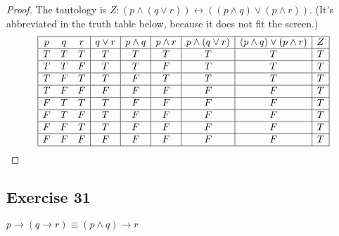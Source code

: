 \documentclass[14pt]{extarticle}
\newcommand{\bic}{\leftrightarrow}
\begin{document}
\begin{proof}
    The tautology is $Z: (p \wedge (q \vee r)) \bic ((p \wedge q) \vee
        (p \wedge r))$. (It's abbreviated in the truth table below, because it does not
    fit the screen.)
    $$
        \begin{array}{|ccc|c|c|c|c|c|c|}
            \hline
            p & q & r & q \vee r & p \wedge q & p \wedge r & p \wedge (q \vee r) & (p \wedge q) \vee (p \wedge r) & Z \\
            \hline
            T & T & T & T        & T          & T          & T                   & T                              & T \\
            \hline
            T & T & F & T        & T          & F          & T                   & T                              & T \\
            \hline
            T & F & T & T        & F          & T          & T                   & T                              & T \\
            \hline
            T & F & F & F        & F          & F          & F                   & F                              & T \\
            \hline
            F & T & T & T        & F          & F          & F                   & F                              & T \\
            \hline
            F & T & F & T        & F          & F          & F                   & F                              & T \\
            \hline
            F & F & T & T        & F          & F          & F                   & F                              & T \\
            \hline
            F & F & F & F        & F          & F          & F                   & F                              & T \\
            \hline
        \end{array}
    $$
\end{proof}

\subsection{Exercise 31}
$p \to (q \to r) \equiv (p \wedge q) \to r$
\end{document}

